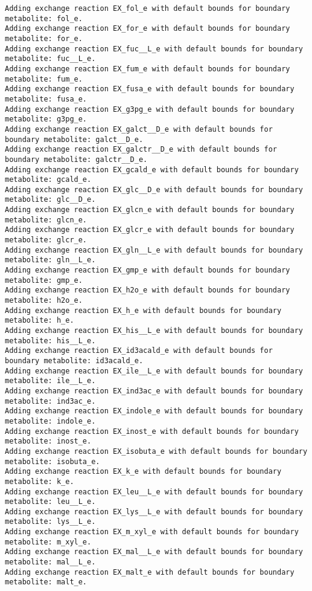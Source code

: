 \documentclass[
  letterpaper,
  DIV=11,
  numbers=noendperiod]{scrartcl}
\begin{document}
\begin{verbatim}
Adding exchange reaction EX_fol_e with default bounds for boundary metabolite: fol_e.
Adding exchange reaction EX_for_e with default bounds for boundary metabolite: for_e.
Adding exchange reaction EX_fuc__L_e with default bounds for boundary metabolite: fuc__L_e.
Adding exchange reaction EX_fum_e with default bounds for boundary metabolite: fum_e.
Adding exchange reaction EX_fusa_e with default bounds for boundary metabolite: fusa_e.
Adding exchange reaction EX_g3pg_e with default bounds for boundary metabolite: g3pg_e.
Adding exchange reaction EX_galct__D_e with default bounds for boundary metabolite: galct__D_e.
Adding exchange reaction EX_galctr__D_e with default bounds for boundary metabolite: galctr__D_e.
Adding exchange reaction EX_gcald_e with default bounds for boundary metabolite: gcald_e.
Adding exchange reaction EX_glc__D_e with default bounds for boundary metabolite: glc__D_e.
Adding exchange reaction EX_glcn_e with default bounds for boundary metabolite: glcn_e.
Adding exchange reaction EX_glcr_e with default bounds for boundary metabolite: glcr_e.
Adding exchange reaction EX_gln__L_e with default bounds for boundary metabolite: gln__L_e.
Adding exchange reaction EX_gmp_e with default bounds for boundary metabolite: gmp_e.
Adding exchange reaction EX_h2o_e with default bounds for boundary metabolite: h2o_e.
Adding exchange reaction EX_h_e with default bounds for boundary metabolite: h_e.
Adding exchange reaction EX_his__L_e with default bounds for boundary metabolite: his__L_e.
Adding exchange reaction EX_id3acald_e with default bounds for boundary metabolite: id3acald_e.
Adding exchange reaction EX_ile__L_e with default bounds for boundary metabolite: ile__L_e.
Adding exchange reaction EX_ind3ac_e with default bounds for boundary metabolite: ind3ac_e.
Adding exchange reaction EX_indole_e with default bounds for boundary metabolite: indole_e.
Adding exchange reaction EX_inost_e with default bounds for boundary metabolite: inost_e.
Adding exchange reaction EX_isobuta_e with default bounds for boundary metabolite: isobuta_e.
Adding exchange reaction EX_k_e with default bounds for boundary metabolite: k_e.
Adding exchange reaction EX_leu__L_e with default bounds for boundary metabolite: leu__L_e.
Adding exchange reaction EX_lys__L_e with default bounds for boundary metabolite: lys__L_e.
Adding exchange reaction EX_m_xyl_e with default bounds for boundary metabolite: m_xyl_e.
Adding exchange reaction EX_mal__L_e with default bounds for boundary metabolite: mal__L_e.
Adding exchange reaction EX_malt_e with default bounds for boundary metabolite: malt_e.

\end{verbatim}
\end{document}

